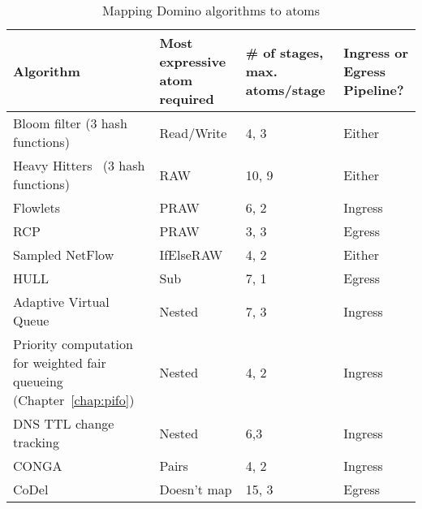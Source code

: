 \begin{table}[!t]
\begin{small}
  \begin{tabular}{|p{}|p{}|p{}|p{}|}
\hline
Algorithm & Most expressive atom required & \# of stages, max. atoms/stage & Ingress or Egress Pipeline?\\
\hline
Bloom filter (3 hash functions) & Read/Write & 4, 3 & Either\\
\hline
Heavy Hitters~\cite{opensketch} (3 hash functions) & RAW & 10, 9 & Either\\
\hline
Flowlets~\cite{flowlets} & PRAW & 6, 2 & Ingress\\
\hline
RCP~\cite{rcp} & PRAW & 3, 3 & Egress\\
\hline
Sampled NetFlow~\cite{sampled_nflow} & IfElseRAW & 4, 2 & Either\\
\hline
HULL~\cite{hull} & Sub & 7, 1 & Egress\\
\hline
Adaptive Virtual Queue~\cite{avq} & Nested & 7, 3 & Ingress\\
\hline
Priority computation for weighted fair queueing (Chapter~\ref{chap:pifo}) & Nested & 4, 2 & Ingress\\
\hline
DNS TTL change tracking~\cite{dns_change} & Nested & 6,3 & Ingress\\
\hline
CONGA~\cite{conga} & Pairs & 4, 2 & Ingress\\
\hline
CoDel~\cite{codel} & Doesn't map & 15, 3 & Egress\\
\hline
\end{tabular}
\end{small}
\caption{Mapping Domino algorithms to atoms}
\label{tab:algo_atoms}
\end{table}
